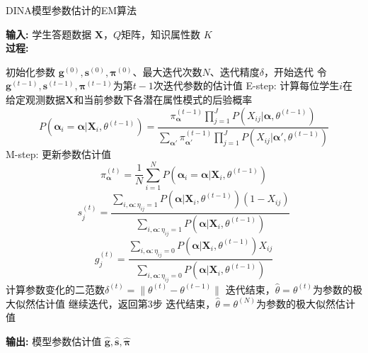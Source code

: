 \documentclass[a4paper,12pt]{ctexart} %
\begin{document}
\begin{center}
    \begin{minipage}{0.95\textwidth}
        \begin{algorithm}[H]
            \caption{DINA模型参数估计的EM算法} 
            \label{alg:dina}
            {\bf 输入:} 学生答题数据 $\boldsymbol{X}$，$Q$矩阵，知识属性数 $K$\\
            {\bf 过程:} 
            \begin{algorithmic}[1]
                \State 初始化参数 $\boldsymbol{g}^{(0)}, \boldsymbol{s}^{(0)}, \boldsymbol{\pi}^{(0)}$、最大迭代次数$N$、迭代精度$\delta$，开始迭代
                \State 令$\boldsymbol{g}^{(t-1)}, \boldsymbol{s}^{(t-1)}, \boldsymbol{\pi}^{(t-1)}$为第$t-1$次迭代参数的估计值
                \State E-step: 计算每位学生$i$在给定观测数据$\boldsymbol{X}$和当前参数下各潜在属性模式的后验概率
                \begin{equation}
                        P(\boldsymbol{\alpha}_i = \boldsymbol{\alpha} | \boldsymbol{X}_i, \theta^{(t-1)}) = \frac{\pi_{\boldsymbol{\alpha}}^{(t-1)} \prod_{j=1}^{J} P(X_{ij} | \boldsymbol{\alpha}, \theta^{(t-1)})}{\sum_{\boldsymbol{\alpha}'} \pi_{\boldsymbol{\alpha}'}^{(t-1)} \prod_{j=1}^{J} P(X_{ij} | \boldsymbol{\alpha}', \theta^{(t-1)})}
                \end{equation}
                \State M-step: 更新参数估计值
                \begin{equation}
                    \pi_{\boldsymbol{\alpha}}^{(t)} = \frac{1}{N} \sum_{i=1}^{N} P(\boldsymbol{\alpha}_i = \boldsymbol{\alpha} | \boldsymbol{X}_i, \theta^{(t-1)})
                \end{equation}
                \begin{equation}
                    s_j^{(t)} = \frac{\sum_{i, \boldsymbol{\alpha}: \eta_{ij}=1} P(\boldsymbol{\alpha} | \boldsymbol{X}_i, \theta^{(t-1)}) (1 - X_{ij})}{\sum_{i, \boldsymbol{\alpha}: \eta_{ij}=1} P(\boldsymbol{\alpha} | \boldsymbol{X}_i, \theta^{(t-1)})}
                \end{equation}
                \begin{equation}
                    g_j^{(t)} = \frac{\sum_{i, \boldsymbol{\alpha}: \eta_{ij}=0} P(\boldsymbol{\alpha} | \boldsymbol{X}_i, \theta^{(t-1)}) X_{ij}}{\sum_{i, \boldsymbol{\alpha}: \eta_{ij}=0} P(\boldsymbol{\alpha} | \boldsymbol{X}_i, \theta^{(t-1)})}
                \end{equation}
                \State 计算参数变化的二范数$\delta^{(t)}=\|\theta^{(t)}-\theta^{(t-1)}\|$
                \State 迭代结束，$\hat{\theta} = \theta^{(t)}$为参数的极大似然估计值
                \Else
                \State 继续迭代，返回第3步
                \EndIf
                \EndFor
                \State 迭代结束，$\hat{\theta} = \theta^{(N)}$为参数的极大似然估计值
            \end{algorithmic}
            {\bf 输出:} 模型参数估计值 $\hat{\boldsymbol{g}}, \hat{\boldsymbol{s}}, \hat{\boldsymbol{\pi}}$
        \end{algorithm}
    \end{minipage}
\end{center}
\end{document}
